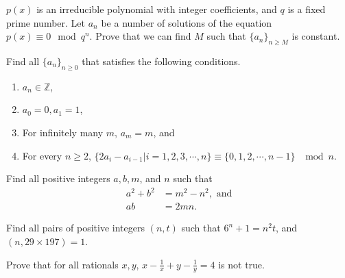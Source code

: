 \documentclass[problems.tex]{subfile}
\begin{document}
	\begin{problem}
		$p(x)$ is an irreducible polynomial with integer coefficients, and $q$ is a fixed prime number. Let $a_n$ be a number of solutions of the equation $p(x)\equiv 0\mod q^n$. Prove that we can find $M$ such that $\{a_n\}_{n\ge M}$ is constant. %
	\end{problem}

	\begin{problem}
		Find all $\{a_n\}_{n\ge 0}$ that satisfies the following conditions.
		\begin{enumerate}
			\item $a_n\in \mathbb{Z}$,
			\item $a_0=0, a_1=1$,
			\item For infinitely many $m$, $a_m=m$, and
			\item For every $n\ge2$, $\{2a_i-a_{i-1} | i=1, 2, 3, \cdots , n\}\equiv \{0, 1, 2, \cdots , n-1\}$ $\mod n$.
		\end{enumerate}
	\end{problem}

	\begin{problem}
		Find all positive integers $a, b, m$, and $n$ such that
		\begin{align*}
			a^2+b^2 &=m^2-n^2, \text{ and}\\
			ab &=2mn.
		\end{align*}
	\end{problem}

	\begin{problem}
		Find all pairs of positive integers $(n,t)$ such that $6^n+1=n^2t$, and $(n,29 \times 197)=1$. %
	\end{problem}

	\begin{problem}
		Prove that for all rationals $x,y$, $x-\frac{1}{x}+y-\frac{1}{y}=4$ is not true. %
	\end{problem}
\end{document}
